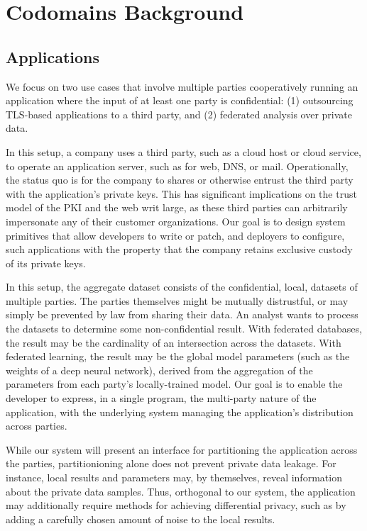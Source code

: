 \section{Codomains Background}
\label{sec:codomains-background}

\subsection{Applications}

We focus on two use cases that involve multiple parties cooperatively running
an application where the input of at least one party is confidential:
(1) outsourcing TLS-based applications to a third party, and (2) federated
analysis over private data.


%
In this setup, a company uses a third party, such as a cloud host or cloud
service, to operate an application server, such as for web, DNS, or mail.
%
Operationally, the status quo is for the company to shares or otherwise entrust
the third party with the application's private keys.
%
This has significant implications on the trust model of the PKI and the web
writ large, as these third parties can arbitrarily impersonate any of their
customer organizations.
%
Our goal is to design system primitives that allow developers to write or
patch, and deployers to configure, such applications with the property that the
company retains exclusive custody of its private keys.


%
In this setup,  the aggregate dataset consists of the confidential, local,
datasets of multiple parties.
% 
The parties themselves might be mutually distrustful, or may simply be
prevented by law from sharing their data.
%
An analyst wants to process the datasets to determine some non-confidential
result.
%
With federated databases, the result may be the cardinality of an intersection
across the datasets.
%
With federated learning, the result may be the global model parameters (such
as the weights of a deep neural network), derived from the aggregation of the
parameters from each party's locally-trained model.
%
Our goal is to enable the developer to express, in a
single program, the multi-party nature of the application, with the underlying
system managing the application's distribution across parties. 


While our system will present an interface for partitioning the application
across the parties, partitionioning alone does not prevent private data
leakage.
%
For instance, local results and parameters may, by themselves, reveal
information about the private data samples.
%
Thus, orthogonal to our system, the application may additionally require
methods for achieving differential privacy, such as by adding a carefully
chosen amount of noise to the local results.



